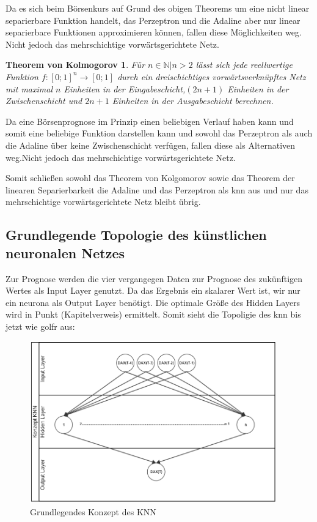 Da es sich beim Börsenkurs auf Grund des obigen Theorems um eine nicht linear separierbare Funktion handelt, das Perzeptron und die Adaline aber nur linear separierbare Funktionen approximieren können, fallen diese Möglichkeiten weg. Nicht jedoch das mehrschichtige vorwärtsgerichtete Netz.


\newtheorem*{theorem1*}{Theorem von Kolmogorov}
\begin{theorem1*}
Für ${n \in \mathbb{N} | n>2}$ lässt sich jede reellwertige Funktion $f:[0;1]^n\rightarrow[0;1]$ durch ein dreischichtiges vorwärtsverknüpftes Netz mit maximal $n$ Einheiten in der Eingabeschicht,$(2n+1)$ Einheiten in der Zwischenschicht und $2n+1$ Einheiten in der Ausgabeschicht berechnen.
\end{theorem1*}

Da eine Börsenprognose im Prinzip einen beliebigen Verlauf haben kann und somit eine beliebige Funktion darstellen kann und  sowohl das Perzeptron als auch die Adaline über keine Zwischenschicht verfügen, fallen diese als Alternativen weg.Nicht jedoch das mehrschichtige vorwärtsgerichtete Netz.

Somit schließen sowohl das Theorem von Kolgomorov sowie das Theorem der linearen Separierbarkeit die Adaline und das Perzeptron als \ac{knn} aus und nur das mehrschichtige vorwärtsgerichtete Netz bleibt übrig.


\subsection{Grundlegende Topologie des künstlichen neuronalen Netzes}
\label{subsection:Grundlegende Topologie des künstlichen neuronalen Netzes}

Zur Prognose werden die vier vergangegen Daten zur Prognose des zukünftigen Wertes als Input Layer genutzt. Da das Ergebnis ein skalarer Wert ist, wir nur ein neurona als Output Layer benötigt. Die optimale Größe des Hidden Layers wird in Punkt (Kapitelverweis) ermittelt. Somit sieht die Topoligie des knn bis jetzt wie golfr aus:

\begin{figure}[H]
\centering
		\includegraphics[width=0.95\textwidth]{KonzeptKNN.PNG}
	\caption{Grundlegendes Konzept des KNN}
	\label{fig:Grundlegendes Konzept des KNN}
\end{figure}

